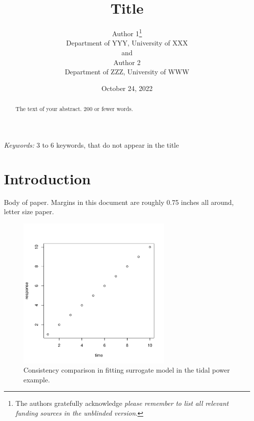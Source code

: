 \documentclass[
  12pt]{article}
\begin{document}
\def\spacingset#1{\renewcommand{\baselinestretch}%
{#1}\small\normalsize} \spacingset{1}



\date{October 24, 2022}
\title{\bf Title}
\author{
Author 1\thanks{The authors gratefully acknowledge \emph{please remember
to list all relevant funding sources in the unblinded version}.}\\
Department of YYY, University of XXX\\
and\\Author 2\\
Department of ZZZ, University of WWW\\
}
\maketitle

\bigskip
\bigskip
\begin{abstract}
The text of your abstract. 200 or fewer words.
\end{abstract}

\noindent%
{\it Keywords:} 3 to 6 keywords, that do not appear in the title
\vfill

\newpage
\spacingset{1.9} %
\ifdefined\Shaded\renewenvironment{Shaded}{\begin{tcolorbox}[boxrule=0pt, borderline west={3pt}{0pt}{shadecolor}, breakable, interior hidden, enhanced, frame hidden, sharp corners]}{\end{tcolorbox}}\fi

\hypertarget{sec-intro}{%
\section{Introduction}\label{sec-intro}}

Body of paper. Margins in this document are roughly 0.75 inches all
around, letter size paper.

\begin{figure}

{\centering \includegraphics[width=3in,height=\textheight]{fig1.pdf}

}

\caption{\label{fig-first}Consistency comparison in fitting surrogate
model in the tidal power example.}

\end{figure}
\end{document}
